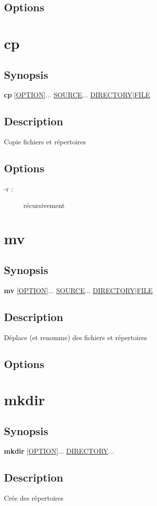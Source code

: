 \documentclass[a4paper, 10pt, onecolumn, openright, oneside]{book}
\begin{document}
			\subsection{Options}
		\section{cp}
			\subsection{Synopsis}
				\textbf{cp} [\ul{OPTION}]... \ul{SOURCE}... \ul{DIRECTORY}|\ul{FILE}
			\subsection{Description}
				Copie fichiers et répertoires
			\subsection{Options}
				\begin{description}
				\item[-r :] récursivement
				\end{description}
		\section{mv}
			\subsection{Synopsis}
				\textbf{mv} [\ul{OPTION}]... \ul{SOURCE}... \ul{DIRECTORY}|\ul{FILE}
			\subsection{Description}
				Déplace (et renomme) des fichiers et répertoires
			\subsection{Options}
		\section{mkdir}
			\subsection{Synopsis}
				\textbf{mkdir} [\ul{OPTION}]... \ul{DIRECTORY}...
			\subsection{Description}
				Crée des répertoires
\end{document}

